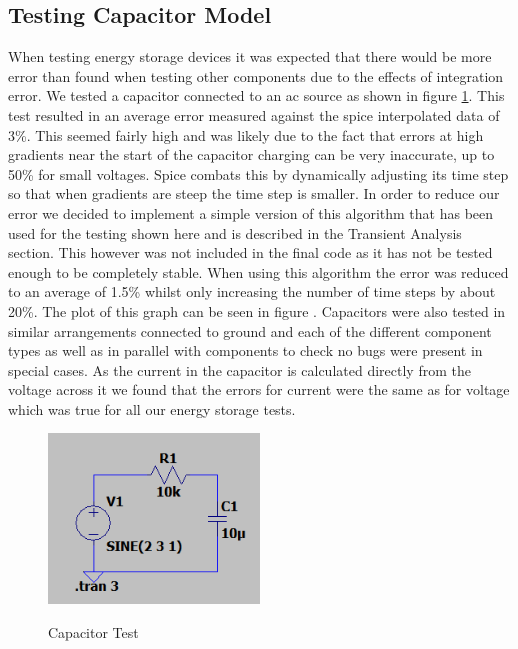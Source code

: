 \documentclass{article}
\begin{document}
\subsection{Testing Capacitor Model}
When testing energy storage devices it was expected that there would be more error than found when testing other components due to the effects of integration error. We tested a capacitor connected to an ac source as shown in figure \ref{fig:CapacitorTest1}. This test resulted in an average error measured against the spice interpolated data of 3\%. This seemed fairly high and was likely due to the fact that errors at high gradients near the start of the capacitor charging can be very inaccurate, up to 50\% for small voltages. Spice combats this by dynamically adjusting its time step so that when gradients are steep the time step is smaller. In order to reduce our error we decided to implement a simple version of this algorithm that has been used for the testing shown here and is described in the Transient Analysis section. This however was not included in the final code as it has not be tested enough to be completely stable. When using this algorithm the error was reduced to an average of 1.5\% whilst only increasing the number of time steps by about 20\%. The plot of this graph can be seen in figure . Capacitors were also tested in similar arrangements connected to ground and each of the different component types as well as in parallel with components to check no bugs were present in special cases. As the current in the capacitor is calculated directly from the voltage across it we found that the errors for current were the same as for voltage which was true for all our energy storage tests. 
\begin{figure}[h]
    \caption{Capacitor Test}
    \centering
    \includegraphics[width=0.5\textwidth]{images/CapacitorTest1.png}
    \label{fig:CapacitorTest1}
\end{figure}
\end{document}
